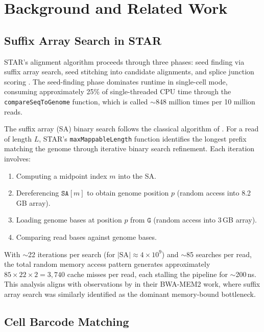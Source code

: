 \documentclass[11pt,twocolumn]{article}
\begin{document}
\section{Background and Related Work}

\subsection{Suffix Array Search in STAR}

STAR's alignment algorithm proceeds through three phases: seed finding via suffix array search, seed stitching into candidate alignments, and splice junction scoring \citep{dobin2013star}. The seed-finding phase dominates runtime in single-cell mode, consuming approximately 25\% of single-threaded CPU time through the \texttt{compareSeqToGenome} function, which is called $\sim$848 million times per 10 million reads.

The suffix array (SA) binary search follows the classical algorithm of \citet{manber1993suffix}. For a read of length $L$, STAR's \texttt{maxMappableLength} function identifies the longest prefix matching the genome through iterative binary search refinement. Each iteration involves:
\begin{enumerate}
  \item Computing a midpoint index $m$ into the SA.
  \item Dereferencing $\texttt{SA}[m]$ to obtain genome position $p$ (random access into 8.2\,GB array).
  \item Loading genome bases at position $p$ from $\texttt{G}$ (random access into 3\,GB array).
  \item Comparing read bases against genome bases.
\end{enumerate}

With $\sim$22 iterations per search (for $|\text{SA}| \approx 4 \times 10^9$) and $\sim$85 searches per read, the total random memory access pattern generates approximately $85 \times 22 \times 2 = 3{,}740$ cache misses per read, each stalling the pipeline for $\sim$200\,ns. This analysis aligns with observations by \citet{vasimuddin2019efficient} in their BWA-MEM2 work, where suffix array search was similarly identified as the dominant memory-bound bottleneck.

\subsection{Cell Barcode Matching}
\end{document}
